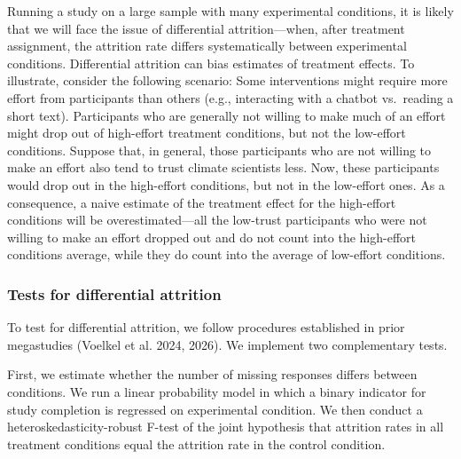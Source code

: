 \documentclass[
  letterpaper,
  DIV=11,
  numbers=noendperiod]{scrartcl}
\begin{document}
Running a study on a large sample with many experimental conditions, it
is likely that we will face the issue of differential attrition---when,
after treatment assignment, the attrition rate differs systematically
between experimental conditions. Differential attrition can bias
estimates of treatment effects. To illustrate, consider the following
scenario: Some interventions might require more effort from participants
than others (e.g., interacting with a chatbot vs.~reading a short text).
Participants who are generally not willing to make much of an effort
might drop out of high-effort treatment conditions, but not the
low-effort conditions. Suppose that, in general, those participants who
are not willing to make an effort also tend to trust climate scientists
less. Now, these participants would drop out in the high-effort
conditions, but not in the low-effort ones. As a consequence, a naive
estimate of the treatment effect for the high-effort conditions will be
overestimated---all the low-trust participants who were not willing to
make an effort dropped out and do not count into the high-effort
conditions average, while they do count into the average of low-effort
conditions.

\subsubsection{Tests for differential
attrition}\label{tests-for-differential-attrition}

To test for differential attrition, we follow procedures established in
prior megastudies (Voelkel et al. 2024, 2026). We implement two
complementary tests.

First, we estimate whether the number of missing responses differs
between conditions. We run a linear probability model in which a binary
indicator for study completion is regressed on experimental condition.
We then conduct a heteroskedasticity-robust F-test of the joint
hypothesis that attrition rates in all treatment conditions equal the
attrition rate in the control condition.
\end{document}
